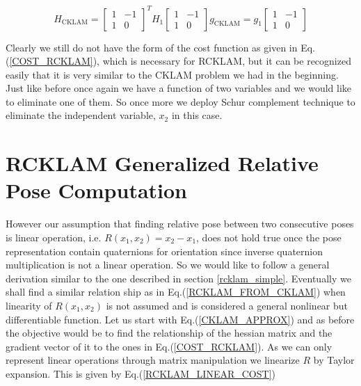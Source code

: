 \begin{subequations}
	\begin{equation}
		H_\mathrm{CKLAM} = \begin{bmatrix} 1 & -1\\ 1 & 0 \end{bmatrix}^T H_1\begin{bmatrix} 1 & -1\\ 1 & 0 \end{bmatrix}
	\end{equation}
	\begin{equation}
		g_\mathrm{CKLAM} = g_1\begin{bmatrix} 1 & -1\\ 1 & 0 \end{bmatrix}
	\end{equation}
	\label{RCKLAM_FROM_CKLAM}
\end{subequations}

Clearly we still do not have the form of the cost function as given in Eq.(\ref{COST_RCKLAM}), which is necessary for RCKLAM, but it can be recognized easily that it is very similar to the CKLAM problem we had in the beginning. Just like before once again we have a function of two variables and we would like to eliminate one of them. So once more we deploy Schur complement technique to eliminate the independent variable, $x_2$ in this case.

\section{RCKLAM Generalized Relative Pose Computation}
However our assumption that finding relative pose between two consecutive poses is linear operation, i.e. $R(x_1, x_2) = x_2 - x_1$, does not hold true once the pose representation contain quaternions for orientation since inverse quaternion multiplication is not a linear operation. So we would like to follow a general derivation similar to the one described in section \ref{rcklam_simple}. Eventually we shall find a similar relation ship as in Eq.(\ref{RCKLAM_FROM_CKLAM}) when linearity of $R(x_1, x_2)$ is not assumed and is considered a general nonlinear but differentiable function. Let us start with Eq.(\ref{CKLAM_APPROX}) and as before the objective would be to find the relationship of the hessian matrix and the gradient vector of it to the ones in Eq.(\ref{COST_RCKLAM}). As we can only represent linear operations through matrix manipulation we linearize $R$ by Taylor expansion. This is given by Eq.(\ref{RCKLAM_LINEAR_COST})

